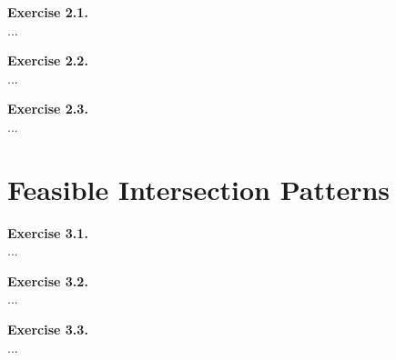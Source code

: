 \documentclass{article}
\begin{document}
\begin{flushleft}
\textbf{Exercise 2.1.} \\
...

\textbf{Exercise 2.2.} \\
...

\textbf{Exercise 2.3.} \\
...

\end{flushleft}
\section{Feasible Intersection Patterns}

\begin{flushleft}
\textbf{Exercise 3.1.} \\
...

\textbf{Exercise 3.2.} \\
...

\textbf{Exercise 3.3.} \\
...
\end{flushleft}
\end{document}
